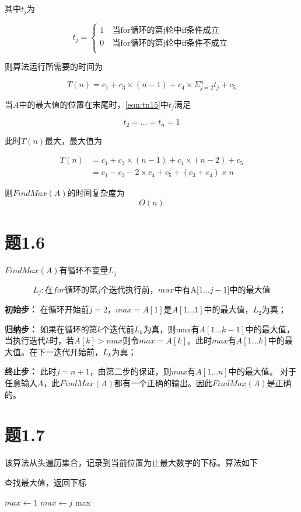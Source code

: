 \documentclass[a4paper,twoside]{article}
\begin{document}
\begin{spacing}{1.2}
其中$t_j$为

$$ t_j=\left\{
\begin{aligned}
	1 & \  \mbox{当for循环的第j轮中if条件成立} \\
	0 & \  \mbox{当for循环的第j轮中if条件不成立} \\
\end{aligned}
\right.
$$

则算法运行所需要的时间为

\begin{equation}
T(n)=c_1 + c_3 \times (n-1) + c_4 \times \Sigma_{j=2}^{n}t_j + c_5 \label{eqn:tn15}
\end{equation}

当$A$中的最大值的位置在末尾时，\eqref{eqn:tn15}中$t_j$满足

$$
t_2=\dots=t_n=1
$$

此时$T(n)$最大，最大值为

\begin{align*}
T(n) & =c_1 + c_3 \times (n-1) + c_4 \times (n-2) + c_5 \\
& = c_1 - c_3 - 2 \times c_4 +c_5 + (c_3+c_4) \times n  
\end{align*}

则$FindMax(A)$的时间复杂度为
$$
O(n)
$$

\section{题1.6}

$FindMax(A)$有循环不变量$L_j$

$$
L_j: \mbox{在$for$循环的第$j$个迭代执行前，$max$中有A[$1 \dots j-1$]中的最大值}
$$

\textbf{初始步：} 在循环开始前$j=2$，$max=A[1]$是$A[1 \dots 1]$中的最大值，$L_2$为真；

\textbf{归纳步：} 如果在循环的第$k$个迭代前$L_{k}$为真，则max有$A[1 \dots k-1]$中的最大值，当执行迭代$k$时，若$A[k] > max$则令$max=A[k]$。此时$max$有$A[1 \dots k]$中的最大值。在下一迭代开始前，$L_k$为真；

\textbf{终止步：} 此时$j=n+1$，由第二步的保证，则$max$有$A[1 \dots n]$中的最大值。
对于任意输入$A$，此$FindMax(A)$都有一个正确的输出。因此$FindMax(A)$是正确的。

\section{题1.7}
该算法从头遍历集合，记录到当前位置为止最大数字的下标。算法如下
\begin{algorithm}
	\caption{查找最大值，返回下标}
	\begin{algorithmic}[1]
		\State $max \gets 1$
		\State $max \gets j$
		\EndIf
		\EndFor
		\Return max
		\EndProcedure
		

\end{algorithmic}
\end{algorithm}
\end{spacing}
\end{document}
